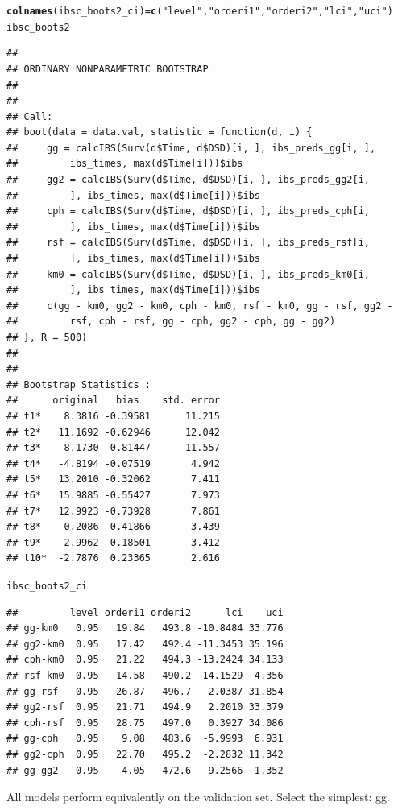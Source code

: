 \documentclass{article}\usepackage[]{graphicx}\usepackage[]{color}
\makeatletter
\newcommand{\hlstr}[1]{\textcolor[rgb]{0.192,0.494,0.8}{#1}}%
\newcommand{\hlstd}[1]{\textcolor[rgb]{0.345,0.345,0.345}{#1}}%
\newcommand{\hlkwb}[1]{\textcolor[rgb]{0.69,0.353,0.396}{#1}}%
\newcommand{\hlkwd}[1]{\textcolor[rgb]{0.737,0.353,0.396}{\textbf{#1}}}%
\newenvironment{kframe}{%
 \def\at@end@of@kframe{}%
 \ifinner\ifhmode%
  \def\at@end@of@kframe{\end{minipage}}%
  \begin{minipage}{\columnwidth}%
 \fi\fi%
 \def\FrameCommand##1{\hskip\@totalleftmargin \hskip-\fboxsep
 \colorbox{shadecolor}{##1}\hskip-\fboxsep
     \hskip-\linewidth \hskip-\@totalleftmargin \hskip\columnwidth}%
 \MakeFramed {\advance\hsize-\width
   \@totalleftmargin\z@ \linewidth\hsize
   \@setminipage}}%
 {\par\unskip\endMakeFramed%
 \at@end@of@kframe}
\newenvironment{knitrout}{}{} %
\makeatother
\begin{document}
\begin{knitrout}
\begin{kframe}
\begin{alltt}
\hlkwd{colnames}\hlstd{(ibsc_boots2_ci)} \hlkwb{=} \hlkwd{c}\hlstd{(}\hlstr{"level"}\hlstd{,} \hlstr{"orderi1"}\hlstd{,} \hlstr{"orderi2"}\hlstd{,} \hlstr{"lci"}\hlstd{,} \hlstr{"uci"}\hlstd{)}
\hlstd{ibsc_boots2}
\end{alltt}
\begin{verbatim}
## 
## ORDINARY NONPARAMETRIC BOOTSTRAP
## 
## 
## Call:
## boot(data = data.val, statistic = function(d, i) {
##     gg = calcIBS(Surv(d$Time, d$DSD)[i, ], ibs_preds_gg[i, ], 
##         ibs_times, max(d$Time[i]))$ibs
##     gg2 = calcIBS(Surv(d$Time, d$DSD)[i, ], ibs_preds_gg2[i, 
##         ], ibs_times, max(d$Time[i]))$ibs
##     cph = calcIBS(Surv(d$Time, d$DSD)[i, ], ibs_preds_cph[i, 
##         ], ibs_times, max(d$Time[i]))$ibs
##     rsf = calcIBS(Surv(d$Time, d$DSD)[i, ], ibs_preds_rsf[i, 
##         ], ibs_times, max(d$Time[i]))$ibs
##     km0 = calcIBS(Surv(d$Time, d$DSD)[i, ], ibs_preds_km0[i, 
##         ], ibs_times, max(d$Time[i]))$ibs
##     c(gg - km0, gg2 - km0, cph - km0, rsf - km0, gg - rsf, gg2 - 
##         rsf, cph - rsf, gg - cph, gg2 - cph, gg - gg2)
## }, R = 500)
## 
## 
## Bootstrap Statistics :
##      original   bias    std. error
## t1*    8.3816 -0.39581      11.215
## t2*   11.1692 -0.62946      12.042
## t3*    8.1730 -0.81447      11.557
## t4*   -4.8194 -0.07519       4.942
## t5*   13.2010 -0.32062       7.411
## t6*   15.9885 -0.55427       7.973
## t7*   12.9923 -0.73928       7.861
## t8*    0.2086  0.41866       3.439
## t9*    2.9962  0.18501       3.412
## t10*  -2.7876  0.23365       2.616
\end{verbatim}
\begin{alltt}
\hlstd{ibsc_boots2_ci}
\end{alltt}
\begin{verbatim}
##         level orderi1 orderi2      lci    uci
## gg-km0   0.95   19.84   493.8 -10.8484 33.776
## gg2-km0  0.95   17.42   492.4 -11.3453 35.196
## cph-km0  0.95   21.22   494.3 -13.2424 34.133
## rsf-km0  0.95   14.58   490.2 -14.1529  4.356
## gg-rsf   0.95   26.87   496.7   2.0387 31.854
## gg2-rsf  0.95   21.71   494.9   2.2010 33.379
## cph-rsf  0.95   28.75   497.0   0.3927 34.086
## gg-cph   0.95    9.08   483.6  -5.9993  6.931
## gg2-cph  0.95   22.70   495.2  -2.2832 11.342
## gg-gg2   0.95    4.05   472.6  -9.2566  1.352
\end{verbatim}
\end{kframe}
\end{knitrout}
All models perform equivalently on the validation set.  Select the simplest: gg.
\end{document}
